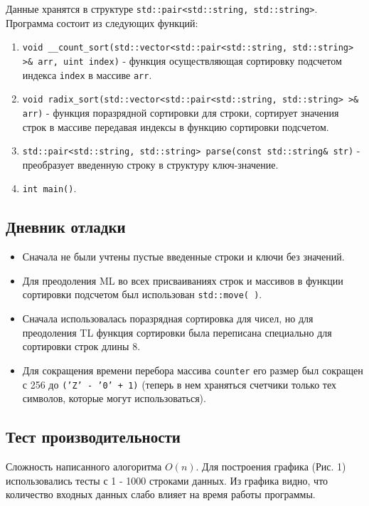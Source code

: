 \documentclass[12pt]{article}
\begin{document}
Данные хранятся в структуре \texttt{std::pair<std::string, std::string>}.
Программа состоит из следующих функций:
\begin{enumerate}
    \item \texttt{void \_\_count\_sort(std::vector<std::pair<std::string, std::string> >\& arr, uint index)}
    - функция осуществляющая сортировку подсчетом индекса \texttt{index} в массиве \texttt{arr}.
    \item \texttt{void radix\_sort(std::vector<std::pair<std::string, std::string> >\& arr)}
    - функция поразрядной сортировки для строки, сортирует значения строк в массиве передавая индексы в функцию сортировки подсчетом.
    \item \texttt{std::pair<std::string, std::string> parse(const std::string\& str)}
    - преобразует введенную строку в структуру ключ-значение.
    \item \texttt{int main()}.
\end{enumerate}

\newpage
\subsection*{Дневник отладки}

\begin{itemize}
    \item Сначала не были учтены пустые введенные строки и ключи без значений.
    \item Для преодоления ML во всех присваиваниях строк и массивов в функции сортировки подсчетом был использован \texttt{std::move( )}.
    \item Сначала использовалась поразрядная сортировка для чисел, но для преодоления TL функция сортировки была переписана специально для сортировки строк длины 8.
    \item Для сокращения времени перебора массива \texttt{counter} его размер был сокращен с 256 до \texttt{('Z' - '0' + 1)} 
    (теперь в нем храняться счетчики только тех символов, которые могут использоваться).
\end{itemize}

\newpage
\subsection*{Тест производительности}

Сложность написанного алогоритма $O(n)$. Для построения графика (Рис. 1) использовались тесты с 1 - 1000 строками данных.
Из графика видно, что количество входных данных слабо влияет на время работы программы.
\end{document}
